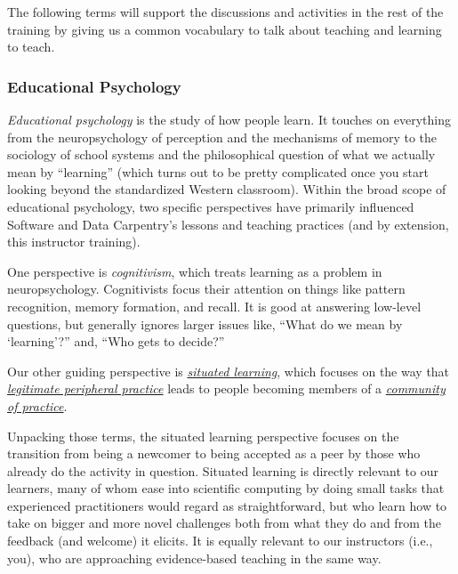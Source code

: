 
The following terms will support the discussions and activities in the
rest of the training by giving us a common vocabulary to talk about
teaching and learning to teach.

\subsubsection{Educational Psychology}\label{educational-psychology}

\emph{Educational psychology} is the study of how people learn. It
touches on everything from the neuropsychology of perception and the
mechanisms of memory to the sociology of school systems and the
philosophical question of what we actually mean by ``learning'' (which
turns out to be pretty complicated once you start looking beyond the
standardized Western classroom). Within the broad scope of educational
psychology, two specific perspectives have primarily influenced Software
and Data Carpentry's lessons and teaching practices (and by extension,
this instructor training).

One perspective is \emph{cognitivism}, which treats learning as a
problem in neuropsychology. Cognitivists focus their attention on things
like pattern recognition, memory formation, and recall. It is good at
answering low-level questions, but generally ignores larger issues like,
``What do we mean by `learning'?'' and, ``Who gets to decide?''

Our other guiding perspective is
\emph{\href{https://en.wikipedia.org/wiki/Situated_learning}{situated
learning}}, which focuses on the way that
\emph{\href{https://en.wikipedia.org/wiki/Legitimate_peripheral_participation}{legitimate
peripheral practice}} leads to people becoming members of a
\emph{\href{https://en.wikipedia.org/wiki/Community_of_practice}{community
of practice}}.

Unpacking those terms, the situated learning perspective focuses on the
transition from being a newcomer to being accepted as a peer by those
who already do the activity in question. Situated learning is directly
relevant to our learners, many of whom ease into scientific computing by
doing small tasks that experienced practitioners would regard as
straightforward, but who learn how to take on bigger and more novel
challenges both from what they do and from the feedback (and welcome) it
elicits. It is equally relevant to our instructors (i.e., you), who are
approaching evidence-based teaching in the same way.

